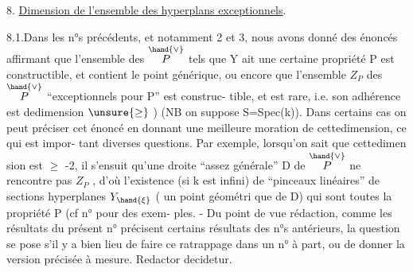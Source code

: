 
8. \uline{Dimension de l'ensemble des hyperplans exceptionnels}.

8.1.Dans les n°s précédents, et notamment 2 et 3, nous avons donné des
énoncés affirmant que l'ensemble des \hand{$\xi\in$} $\overset{\hand{\vee}}{P}$ tels que Y ait une certaine
propriété P est constructible, et contient le point générique\inserted{\unsure{$\overset{\vee}{\ }$}}\hand{/},  ou
encore que l'ensemble $Z_P$ des \hand{$\xi\in$} $\overset{\hand{\vee}}{P}$ ``exceptionnels pour P'' est construc-%
tible, et est rare, i.e. son adhérence est dedimension $\unsure{\geq}$ ) 
(NB on suppose S=Spec(k)). Dans certains cas on peut préciser cet énoncé
en donnant une meilleure moration de cettedimension, ce qui est impor-%
tant  diverses questions. Par exemple, lorsqu'on sait que cettedimen
sion est $\geq$ -2, il s'ensuit qu'une droite ``assez générale'' D de $\overset{\hand{\vee}}{P}$
ne rencontre pas $Z_P$ , d'où l'existence (si k est infini) de ``pinceaux
linéaires'' de sections hyperplanes  $Y_{\hand{\xi}}$ (\hand{$\xi$} un point géométri
que de D) qui sont toutes la propriété P (cf n°  pour des exem-%
ples. - Du point de vue rédaction, comme les résultats du présent n°
précisent certains résultats des n°s antérieurs, la question se pose s'il
y a bien lieu de faire ce ratrappage dans un n° à part, ou de donner la
version précisée à mesure. Redactor decidetur.


